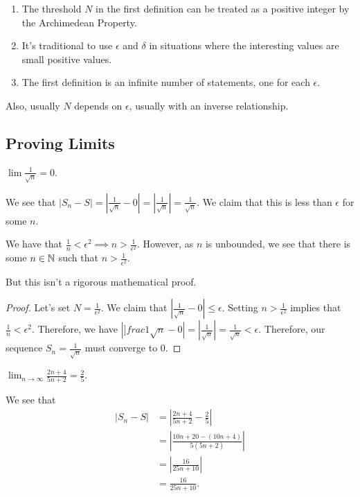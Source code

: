 \documentclass{book}
\begin{document}
\begin{remark}
    \begin{enumerate}
        \item The threshold $N$ in the first definition can be treated as a positive integer by the Archimedean Property.
        \item It's traditional to use $\epsilon$ and $\delta$ in situations where the interesting values are small positive values.
        \item The first definition is an infinite number of statements, one for each $\epsilon$.
    \end{enumerate}
\end{remark}

Also, usually $N$ depends on $\epsilon$, usually with an inverse relationship.

\subsection{Proving Limits}
\begin{ex}
    $\lim \frac{1}{\sqrt n} = 0$.
\end{ex}

We see that $|S_n - S| = |\frac{1}{\sqrt n} - 0| = |\frac{1}{\sqrt n}| = \frac{1}{\sqrt n}$. We claim that this is less than $\epsilon$ for some $n$.

We have that $\frac{1}{n} < \epsilon^2 \implies n > \frac{1}{\epsilon^2}$. However, as $n$ is unbounded, we see that there is some $n \in \mathbb{N}$ such that $n > \frac{1}{\epsilon^2}$. 

But this isn't a rigorous mathematical proof.

\begin{proof}
    Let's set $N = \frac{1}{\epsilon^2}$. We claim that $|\frac{1}{\sqrt n} - 0| \leq \epsilon$. Setting $n > \frac{1}{\epsilon^2}$ implies that $\frac{1}{n} < \epsilon^2$. Therefore, we have $|]frac{1}{\sqrt n} - 0| = |\frac{1}{\sqrt n}| = \frac{1}{\sqrt n} < \epsilon$. Therefore, our sequence $S_n = \frac{1}{\sqrt n}$ must converge to $0$.
\end{proof}

\begin{ex}
    $\lim_{n \to \infty} \frac{2n + 4}{5n + 2} = \frac{2}{5}$.
\end{ex}

We see that \begin{align*}
    |S_n - S| &= |\frac{2n + 4}{5n + 2} - \frac{2}{5}| \\
    &= |\frac{10n + 20 - (10n + 4)}{5(5n + 2)}|\\
    &= |\frac{16}{25n + 10}| \\
    &= \frac{16}{25n + 10}.
\end{align*}
\end{document}
